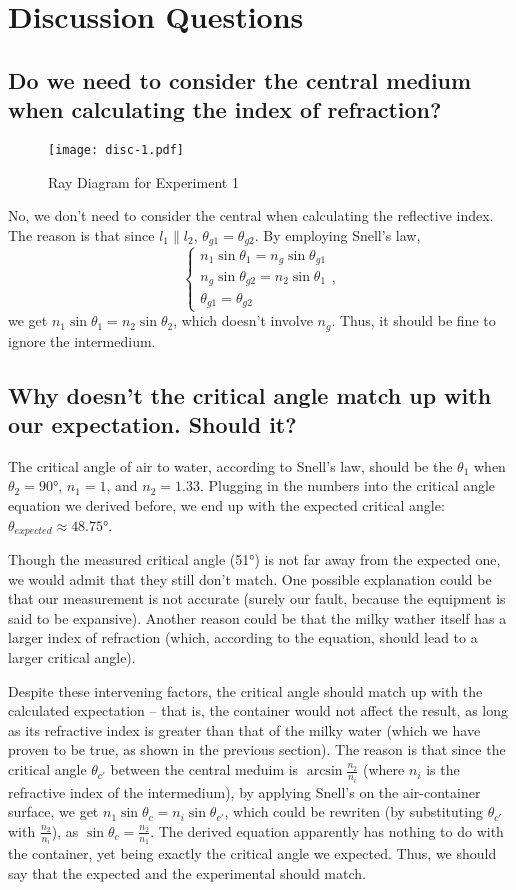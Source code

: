 \documentclass{elegantpaper}
\begin{document}
\section{Discussion Questions}
\subsection{Do we need to consider the central medium when calculating the index of refraction?}
\begin{figure}[!ht]
	\centering
	\texttt{[image: disc-1.pdf]}
	\caption{Ray Diagram for Experiment 1}
	\centering
  \label{label:Disc-1}
\end{figure}
No, we don't need to consider the central when calculating the reflective index. The reason is that since $l_1 \parallel l_2$, $\theta_{g1}=\theta_{g2}$. By employing Snell's law,
\begin{equation*}
  \begin{cases}
    n_1\sin{\theta_1}=n_g\sin{\theta_{g1}}\\
    n_g\sin{\theta_{g2}}=n_2\sin{\theta_1}\\
    \theta_{g1}=\theta_{g2}
  \end{cases},
\end{equation*}
we get $n_1\sin{\theta_1}=n_2\sin{\theta_2}$, which doesn't involve $n_g$. Thus, it should be fine to ignore the intermedium.
\subsection{Why doesn't the critical angle match up with our expectation. Should it?}
The critical angle of air to water, according to Snell's law, should be the $\theta_1$ when $\theta_2=\ang{90}$, $n_1=1$, and $n_2=1.33$. Plugging in the numbers into the critical angle equation we derived before, we end up with the expected critical angle: $\theta_{expected}\approx\ang{48.75}$.

Though the measured critical angle (\ang{51}) is not far away from the expected one, we would admit that they still don't match. One possible explanation could be that our measurement is not accurate (surely our fault, because the equipment is said to be expansive). Another reason could be that the milky wather itself has a larger index of refraction (which, according to the equation, should lead to a larger critical angle).

Despite these intervening factors, the critical angle should match up with the calculated expectation -- that is, the container would not affect the result, as long as its refractive index is greater than that of the milky water (which we have proven to be true, as shown in the previous section). The reason is that since the critical angle $\theta_{c\prime}$ between the central meduim is $\arcsin{\frac{n_2}{n_i}}$ (where $n_i$ is the refractive index of the intermedium), by applying Snell's on the air-container surface, we get $n_1\sin{\theta_c}=n_i\sin{\theta_{c\prime}}$, which could be rewriten (by substituting $\theta_{c\prime}$ with $\frac{n_2}{n_i}$), as $\sin{\theta_c}=\frac{n_2}{n_1}$. The derived equation apparently has nothing to do with the container, yet being exactly the critical angle we expected. Thus, we should say that the expected and the experimental should match.
\clearpage
\end{document}
